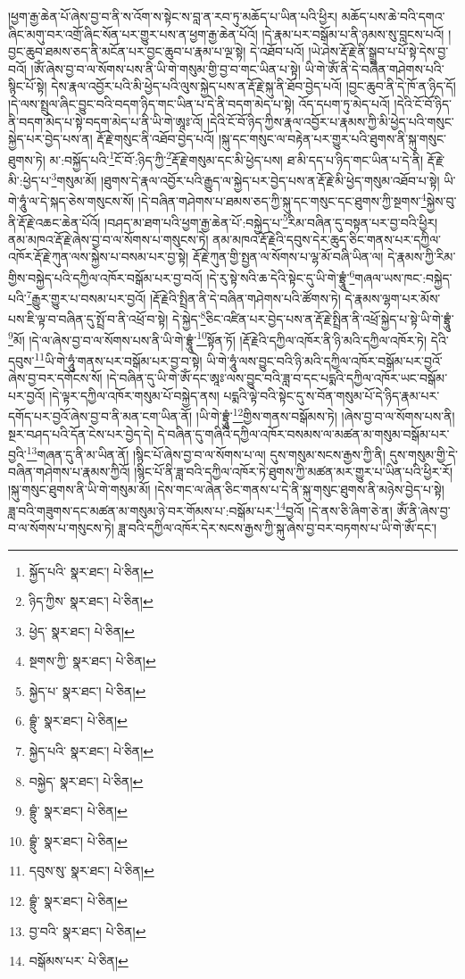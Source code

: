 །ཕྱག་རྒྱ་ཆེན་པོ་ཞེས་བྱ་བ་ནི་ས་འོག་ས་སྟེང་ས་བླ་ན་རབ་ཏུ་མཆོད་པ་ཡིན་པའི་ཕྱིར། མཆོད་པས་ཆེ་བའི་དགའ་ཞིང་མགུ་བར་འགྲོ་ཞིང་སོན་པར་གྱུར་པས་ན་ཕྱག་རྒྱ་ཆེན་པོའོ། །དེ་རྣམ་པར་བསྒོམ་པ་ནི་ཉམས་སུ་བླངས་པའོ། །བྱང་ཆུབ་ཐམས་ཅད་ནི་མངོན་པར་བྱང་ཆུབ་པ་རྣམ་པ་ལྔ་སྟེ། དེ་འཐོབ་པའོ། །ཡེ་ཤེས་རྡོ་རྗེ་ནི་སྒྲུབ་པ་པོ་སྟེ་དེས་བྱ་བའོ། །ཨོཾ་ཞེས་བྱ་བ་ལ་སོགས་པས་ནི་ཡི་གེ་གསུམ་གྱི་བྱ་བ་གང་ཡིན་པ་སྟེ། ཡི་གེ་ཨོཾ་ནི་དེ་བཞིན་གཤེགས་པའི་སྙིང་པོ་སྟེ། དེས་རྣལ་འབྱོར་པའི་མི་ཕྱེད་པའི་ལུས་སྐྱེད་པས་ན་རྡོ་རྗེ་སྐུ་ནི་ཐོབ་བྱེད་པའོ། །བྱང་ཆུབ་ནི་དེ་ཁོ་ན་ཉིད་དོ། །དེ་ལས་སྤྲུལ་ཞིང་བྱུང་བའི་བདག་ཉིད་གང་ཡིན་པ་དེ་ནི་བདག་མེད་པ་སྟེ། འོད་དཔག་ཏུ་མེད་པའོ། །དེའི་ངོ་བོ་ཉིད་ནི་བདག་མེད་པ་སྟེ་བདག་མེད་པ་ནི་ཡི་གེ་ཨཱཿ་འོ། །དེའི་ངོ་བོ་ཉིད་ཀྱིས་རྣལ་འབྱོར་པ་རྣམས་ཀྱི་མི་ཕྱེད་པའི་གསུང་སྐྱེད་པར་བྱེད་པས་ན། རྡོ་རྗེ་གསུང་ནི་འཐོབ་བྱེད་པའོ། །སྐུ་དང་གསུང་ལ་བརྟེན་པར་གྱུར་པའི་ཐུགས་ནི་སྐུ་གསུང་ཐུགས་ཏེ། མ་:བསྐྱོད་པའི་\footnote{སྐྱོད་པའི་  སྣར་ཐང་།  པེ་ཅིན། }ངོ་བོ་:ཉིད་ཀྱི་\footnote{ཉིད་ཀྱིས་  སྣར་ཐང་།  པེ་ཅིན། }རྡོ་རྗེ་གསུམ་དང་མི་ཕྱེད་པས། ཐ་མི་དད་པ་ཉིད་གང་ཡིན་པ་དེ་ནི། རྡོ་རྗེ་མི་:ཕྱེད་པ་\footnote{ཕྱེད་  སྣར་ཐང་།  པེ་ཅིན། }གསུམ་མོ། །ཐུགས་དེ་རྣལ་འབྱོར་པའི་རྒྱུད་ལ་སྐྱེད་པར་བྱེད་པས་ན་རྡོ་རྗེ་མི་ཕྱེད་གསུམ་འཐོབ་པ་སྟེ། ཡི་གེ་ཧཱུཾ་ལ་དེ་སྐད་ཅེས་གསུངས་སོ། །དེ་བཞིན་གཤེགས་པ་ཐམས་ཅད་ཀྱི་སྐུ་དང་གསུང་དང་ཐུགས་ཀྱི་སྔགས་\footnote{སྔགས་ཀྱི་  སྣར་ཐང་།  པེ་ཅིན། }སྐྱེས་བུ་ནི་རྡོ་རྗེ་འཆང་ཆེན་པོའོ། །བཤད་མ་ཐག་པའི་ཕྱག་རྒྱ་ཆེན་པོ་:བསྐྱེད་པ་\footnote{སྐྱེད་པ་  སྣར་ཐང་།  པེ་ཅིན། }རིམ་བཞིན་དུ་བསྟན་པར་བྱ་བའི་ཕྱིར། ནམ་མཁའ་རྡོ་རྗེ་ཞེས་བྱ་བ་ལ་སོགས་པ་གསུངས་ཏེ། ནམ་མཁའ་རྡོ་རྗེའི་དབུས་དེར་ཆུད་ཅིང་གནས་པར་དཀྱིལ་འཁོར་རྡོ་རྗེ་ཀུན་ལས་སྐྱེས་པ་བསམ་པར་བྱ་སྟེ། རྡོ་རྗེ་ཀུན་གྱི་སྤྱན་ལ་སོགས་པ་ལྷ་མོ་བཞི་ཡིན་ལ། དེ་རྣམས་ཀྱི་རིམ་གྱིས་བསྐྱེད་པའི་དཀྱིལ་འཁོར་བསྒོམ་པར་བྱ་བའོ། །དེ་རུ་སྟེ་སའི་ཆ་དེའི་སྟེང་དུ་ཡི་གེ་བྷྲཱུཾ་\footnote{བྷྲུཾ་  སྣར་ཐང་།  པེ་ཅིན། }གཞལ་ཡས་ཁང་:བསྐྱེད་པའི་\footnote{སྐྱེད་པའི་  སྣར་ཐང་།  པེ་ཅིན། }རྒྱུར་གྱུར་པ་བསམ་པར་བྱའོ། །རྡོ་རྗེའི་སྤྲིན་ནི་དེ་བཞིན་གཤེགས་པའི་ཚོགས་ཏེ། དེ་རྣམས་ལྷག་པར་མོས་པས་ཇི་ལྟ་བ་བཞིན་དུ་སྤྲོ་བ་ནི་འཕྲོ་བ་སྟེ། དེ་སྐྱེད་\footnote{བསྐྱེད་  སྣར་ཐང་།  པེ་ཅིན། }ཅིང་འཛིན་པར་བྱེད་པས་ན་རྡོ་རྗེ་སྤྲིན་ནི་འཕྲོ་སྐྱེད་པ་སྟེ་ཡི་གེ་བྷྲཱུཾ་\footnote{བྷྲུཾ་  སྣར་ཐང་།  པེ་ཅིན། }མོ། །དེ་ལ་ཞེས་བྱ་བ་ལ་སོགས་པས་ནི་ཡི་གེ་བྷྲཱུཾ་\footnote{བྷྲུཾ་  སྣར་ཐང་།  པེ་ཅིན། }སྟོན་ཏོ། །རྡོ་རྗེའི་དཀྱིལ་འཁོར་ནི་ཉི་མའི་དཀྱིལ་འཁོར་ཏེ། དེའི་དབུས་\footnote{དབུས་སུ་  སྣར་ཐང་།  པེ་ཅིན། }ཡི་གེ་ཧཱུཾ་གནས་པར་བསྒོམ་པར་བྱ་བ་སྟེ། ཡི་གེ་ཧཱུཾ་ལས་བྱུང་བའི་ཉི་མའི་དཀྱིལ་འཁོར་བསྒོམ་པར་བྱའོ་ཞེས་བྱ་བར་དགོངས་སོ། །དེ་བཞིན་དུ་ཡི་གེ་ཨོཾ་དང་ཨཱཿ་ལས་བྱུང་བའི་ཟླ་བ་དང་པདྨའི་དཀྱིལ་འཁོར་ཡང་བསྒོམ་པར་བྱའོ། །དེ་ལྟར་དཀྱིལ་འཁོར་གསུམ་པོ་བསྐྱེད་ནས། པདྨའི་ལྟེ་བའི་སྟེང་དུ་ས་བོན་གསུམ་པོ་དེ་ཉིད་རྣམ་པར་དགོད་པར་བྱའོ་ཞེས་བྱ་བ་ནི་མན་ངག་ཡིན་ནོ། །ཡི་གེ་བྷྲཱུཾ་\footnote{བྷྲུཾ་  སྣར་ཐང་།  པེ་ཅིན། }གྱིས་གནས་བསྒོམས་ཏེ། །ཞེས་བྱ་བ་ལ་སོགས་པས་ནི། སྔར་བཤད་པའི་དོན་ངེས་པར་བྱེད་དེ། དེ་བཞིན་དུ་གཞིའི་དཀྱིལ་འཁོར་བསམས་ལ་མཚན་མ་གསུམ་བསྒོམ་པར་བྱའི་\footnote{བྱ་བའི་  སྣར་ཐང་།  པེ་ཅིན། }གཞན་དུ་ནི་མ་ཡིན་ནོ། །སྙིང་པོ་ཞེས་བྱ་བ་ལ་སོགས་པ་ལ། དུས་གསུམ་སངས་རྒྱས་ཀྱི་ནི། དུས་གསུམ་གྱི་དེ་བཞིན་གཤེགས་པ་རྣམས་ཀྱིའོ། །སྙིང་པོ་ནི་ཟླ་བའི་དཀྱིལ་འཁོར་ཏེ་ཐུགས་ཀྱི་མཚན་མར་གྱུར་པ་ཡིན་པའི་ཕྱིར་རོ། །སྐུ་གསུང་ཐུགས་ནི་ཡི་གེ་གསུམ་མོ། །དེས་གང་ལ་ཞེན་ཅིང་གནས་པ་དེ་ནི་སྐུ་གསུང་ཐུགས་ནི་མཉེས་བྱེད་པ་སྟེ། ཟླ་བའི་གཟུགས་དང་མཚན་མ་གསུམ་ཉེ་བར་གོམས་པ་:བསྒོམ་པར་\footnote{བསྒོམས་པར་  པེ་ཅིན། }བྱའོ། །དེ་ནས་ཅི་ཞིག་ཅེ་ན། ཨོཾ་ནི་ཞེས་བྱ་བ་ལ་སོགས་པ་གསུངས་ཏེ། ཟླ་བའི་དཀྱིལ་འཁོར་དེར་སངས་རྒྱས་ཀྱི་སྐུ་ཞེས་བྱ་བར་བཏགས་པ་ཡི་གེ་ཨོཾ་དང་། 